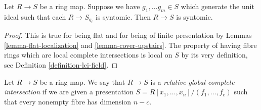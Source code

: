\begin{lemma}
\label{lemma-local-syntomic}
Let $R \to S$ be a ring map.
Suppose we have $g_1, \ldots g_m \in S$ which generate the
unit ideal such that each $R \to S_{g_i}$ is syntomic.
Then $R \to S$ is syntomic.
\end{lemma}

\begin{proof}
This is true for being flat and for being of finite presentation by
Lemmas \ref{lemma-flat-localization} and \ref{lemma-cover-upstairs}.
The property of having fibre rings which are local complete intersections
is local on $S$ by its very definition, see
Definition \ref{definition-lci-field}.
\end{proof}

\begin{definition}
\label{definition-relative-global-complete-intersection}
Let $R \to S$ be a ring map. We say that $R \to S$ is
a {\it relative global complete intersection} if we are
given a presentation $S = R[x_1, \ldots, x_n]/(f_1, \ldots, f_c)$ such that
every nonempty fibre has dimension $n - c$.
\end{definition}

